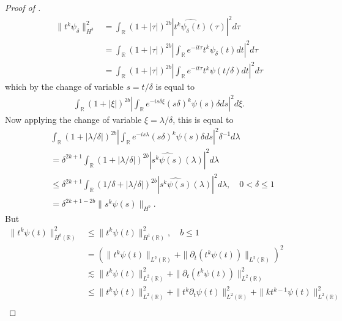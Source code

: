 \documentclass[12pt,reqno]{amsart}
\numberwithin{equation}{section}  %
\renewcommand{\cref}{\Cref}
\newcommand{\rr}{\mathbb{R}}
\newcommand{\wh}{\widehat}
\newcommand{\p}{\partial}
\begin{document}
\begin{appendices}
\begin{proof}[Proof of \cref{lem:pre-bilin-est}]
\begin{equation}
\begin{split}
  \| t^{k} \psi_{\delta} \|^{2}_{H^{b}} 
  & = \int_{\rr} (1 + | \tau |)^{2b} | \wh{t^{k}\psi_{\delta}(t)}(\tau) |^{2} d \tau
  \\
  & = \int_{\rr} (1 + | \tau |)^{2b} | \int_{\rr} e^{-it \tau} t^{k}
  \psi_{\delta}(t) dt |^{2} d \tau
  \\
  & = \int_{\rr} (1 + | \tau |)^{2b} | \int_{\rr} e^{-it \tau} t^{k}
  \psi(t/\delta) dt |^{2} d \tau
    \end{split}
\end{equation}
%
%
which by the change of variable $s = t/\delta$ is equal to
%
%
%
%
\begin{equation}
  \label{2h}
\begin{split}
  \int_{\rr} (1 + | \xi |)^{2b} | \int_{\rr} e^{-is\delta \xi} (s\delta)^{k} \psi(s) \delta ds
  |^{2} d \xi.
\end{split}
\end{equation}
%
%
Now applying the change of variable $\xi = \lambda/\delta$, this is equal to
%
%
%
\begin{equation}
  \label{3h}
\begin{split}
  & \int_{\rr} \left( 1 + | \lambda/\delta | \right)^{2b} | \int_{\rr} e^{-is\lambda}
  (s\delta)^{k} \psi(s) \delta ds |^{2} \delta^{-1} d \lambda
  \\
  & = \delta^{2k+1}
  \int_{\rr} \left( 1 + | \lambda/\delta | \right)^{2b} | \wh{s^{k}
  \psi(s)}(\lambda )|^{2}  d \lambda
  \\
  & \le \delta^{2k+1}
  \int_{\rr} \left( 1/\delta + | \lambda/\delta | \right)^{2b} | \wh{s^{k}
  \psi(s)}(\lambda )|^{2}  d \lambda, \quad 0 < \delta \le 1
  \\
  & = \delta^{2k +1 -2b} \| s^{k} \psi(s) \|_{H^{b}}.
\end{split}
\end{equation}
%
%
But
%
%
\begin{equation}
	\label{4ng}
	\begin{split}
		\|t^k \psi(t) \|_{H^b(\rr)}^2
    & \le \|t^k \psi(t) \|_{H^1(\rr)}^2, \quad b \le 1
		\\
    & = \left( \|t^k \psi(t)\|_{L^2(\rr)} + \|\p_t \left( t^k \psi(t)
		\right)\|_{L^2(\rr)} \right)^2
		\\
		& \lesssim \|t^{k}\psi(t) \|_{L^2(\rr)}^2 + \|\p_t \left (t^{k}
		\psi(t) \right )\|_{L^2(\rr)}^2
		\\
		& \le \|t^k \psi(t) \|_{L^2(\rr)}^2 + \|t^k \p_t \psi(t)
		\|_{L^2(\rr)}^2 + \|k t^{k -1} \psi(t) \|_{L^2(\rr)}^2
		\\

\end{split}
\end{equation}
\end{proof}
\end{appendices}
\end{document}

